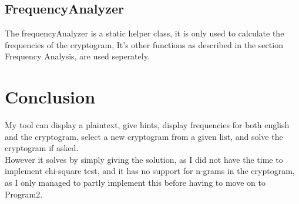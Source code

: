 \subsection*{FrequencyAnalyzer}
The frequencyAnalyzer is a static helper class, it is only used to calculate the
frequencies of the cryptogram, It's other functions as described in the
section Frequency Analysis, are used seperately.
\section*{Conclusion}
My tool can display a plaintext, give hints, display frequencies for both
english and the cryptogram, select a new cryptogram from a given list, and solve
the cryptogram if asked.\\
However it solves by simply giving the solution, as I did not have the
time to implement chi-square test, and it has no support for n-grams in the
cryptogram, as I only managed to partly implement this before having to move on
to Program2.
